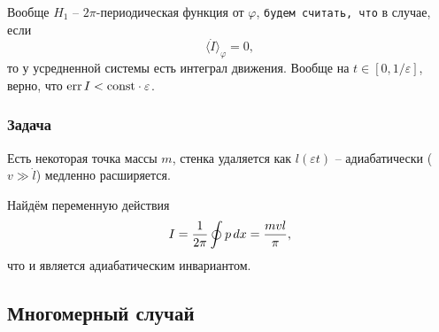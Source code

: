 Вообще $H_1$ -- $2\pi$-периодическая функция от $\varphi$, \texttt{будем считать, что} в случае, если 
\begin{equation*}
    \langle \dot{I} \rangle_\varphi = 0,
\end{equation*}
то у усредненной системы есть интеграл движения. Вообще на $t \in [0, 1/\varepsilon]$, верно, что $\textnormal{err}\, I < \text{const} \cdot \varepsilon$.

\subsubsection*{Задача}

Есть некоторая точка массы $m$, стенка удаляется как $l(\varepsilon t)$ -- адиабатически ($v \gg \dot{l}$) медленно расширяется. 

Найдём переменную действия 
\begin{equation*}
    I = \frac{1}{2\pi} \oint p \, d x = \frac{m v l}{\pi},
\end{equation*}
что и является адиабатическим инвариантом. 

\subsection{Многомерный случай}

